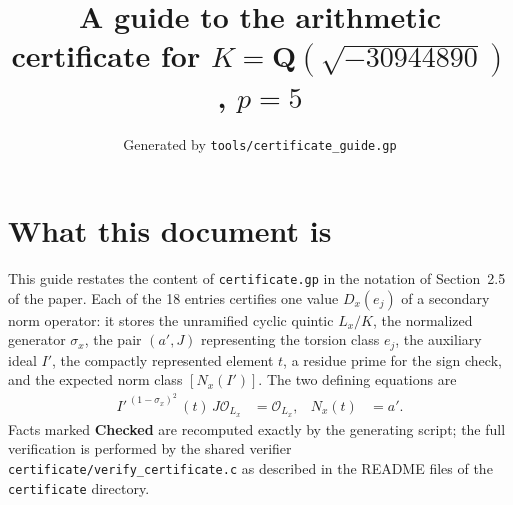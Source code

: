 \documentclass[11pt]{article}
\title{A guide to the arithmetic certificate for $K=\mathbf Q(\sqrt{-30944890})$, $p=5$}
\author{}
\date{Generated by \texttt{tools/certificate\_guide.gp}}
\begin{document}
\maketitle
\section*{What this document is}
This guide restates the content of \texttt{certificate.gp} in the
notation of Section~2.5 of the paper.  Each of the 18 entries
certifies one value $D_x(e_j)$ of a secondary norm operator: it
stores the unramified cyclic quintic $L_x/K$, the normalized
generator $\sigma_x$, the pair $(a',J)$ representing the torsion
class $e_j$, the auxiliary ideal $I'$, the compactly represented
element $t$, a residue prime for the sign check, and the expected
norm class $[N_x(I')]$.  The two defining equations are
\begin{align*}
I'^{\,(1-\sigma_x)^2}\,(t)\,J\mathcal O_{L_x}&=\mathcal O_{L_x},&
N_x(t)&=a'.
\end{align*}
Facts marked \textbf{Checked} are recomputed exactly by the
generating script; the full verification is performed by the
shared verifier \texttt{certificate/verify\_certificate.c} as
described in the README files of the \texttt{certificate}
directory.
\end{document}
